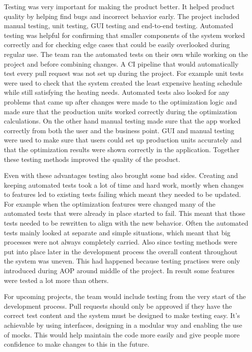 Testing was very important for making the product better. It  helped product quality by helping find bugs and incorrect behavior early. The project included manual testing, unit testing, GUI testing and end-to-end testing. Automated testing was helpful for confirming that smaller components of the system worked correctly and for checking edge cases that could be easily overlooked during regular use. The team ran the automated tests on their own while working on the project and before combining changes. A CI pipeline that would automatically test every pull request was not set up during the project. For example unit tests were used to check that the system created the least expensive heating schedule while still satisfying the heating needs. Automated tests also looked for any problems that came up after changes were made to the optimization logic and made sure that the production units worked correctly during the optimization calculations. On the other hand manual testing made sure that the app worked correctly from both  the user and the business point. GUI and manual testing were used to make sure that users could set up production units accurately and that the optimization results were shown correctly in the application. Together these testing methods improved the quality of the product.
\par
Even with these advantages testing also brought some bad sides. Creating and keeping automated tests took a lot of time and hard work, mostly when changes to features led to existing tests failing which meant they needed to be updated. For example when the optimization features were changed many of the automated tests that were already in place started to fail. This meant that those tests needed to be rewritten to align with the new behavior. Often the automated tests mainly looked at separate and simple situations, which meant that big processes were not always completely carried. Also since testing methods were put into place later in the development process the overall content throughout the system was uneven. This had happened because testing practises were only introduced during AOP around middle of the project. In result some features were tested a lot more than others.
\par
For upcoming projects, the team would include testing from the very start of the development process. Pull requests should only be approved if they have the correct test content and the system must be designed to make testing easy. It's achievable by using interfaces, designing in a modular way and enabling the use of mocks. This would help maintain the code more easily and give people more confidence to make changes to this in the future.

